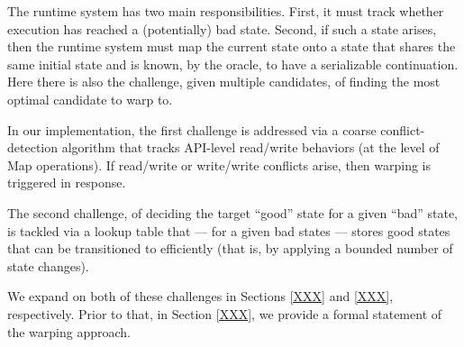 The runtime system has two main responsibilities. First, it must track whether execution has reached a (potentially) bad state. Second, if such a state arises, then the runtime system must map the current state onto a state that shares the same initial state and is known, by the oracle, to have a serializable continuation. Here there is also the challenge, given multiple candidates, of finding the most optimal candidate to warp to.

In our implementation, the first challenge is addressed via a coarse conflict-detection algorithm that tracks API-level read/write behaviors (at the level of {\sf Map} operations). If read/write or write/write conflicts arise, then warping is triggered in response. 

The second challenge, of deciding the target ``good'' state for a given ``bad'' state, is tackled via a lookup table that --- for a given bad states --- stores good states that can be transitioned to efficiently (that is, by applying a bounded number of state changes).

We expand on both of these challenges in Sections \ref{XXX} and \ref{XXX}, respectively. Prior to that, in Section \ref{XXX}, we provide a formal statement of the warping approach.